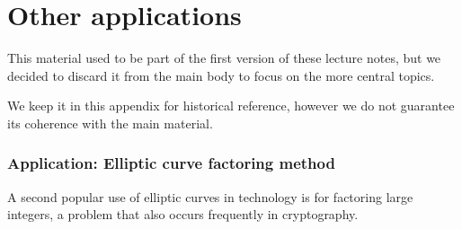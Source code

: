 \documentclass[10pt]{article}
\theoremstyle{plain}
\theoremstyle{definition}
\begin{document}






\clearpage
{}




\clearpage
\appendix
\part{Other applications}

This material used to be part of the first version of these lecture
notes, but we decided to discard it from the main body to focus on the
more central topics.

We keep it in this appendix for historical reference, however we do
not guarantee its coherence with the main material.

\section{Application: Elliptic curve factoring method}

A second popular use of elliptic curves in technology is for factoring
large integers, a problem that also occurs frequently in cryptography.
\end{document}
